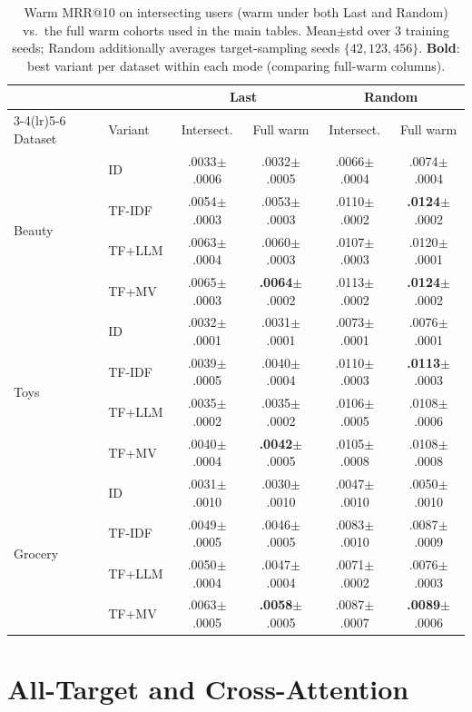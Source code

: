 \documentclass[sigconf,natbib=true,anonymous]{acmart}
\newcommand{\tfidf}{\textsc{TF-IDF}\xspace}
\newcommand{\tfllm}{\textsc{TF+LLM}\xspace}
\newcommand{\tfmv}{\textsc{TF+MV}\xspace}
\begin{document}
\begin{table}[h]
\centering
\caption{Warm MRR@10 on intersecting users (warm under both Last and Random) vs.\ the full warm cohorts used in the main tables. Mean$\pm$std over 3 training seeds; Random additionally averages target-sampling seeds $\{42,123,456\}$. \textbf{Bold}: best variant per dataset within each mode (comparing full-warm columns).}
\label{tab:intersection}
\small
\setlength{\tabcolsep}{3pt}
\begin{tabular}{@{}llcccc@{}}
\toprule
& & \multicolumn{2}{c}{Last} & \multicolumn{2}{c}{Random} \\
\cmidrule(lr){3-4}\cmidrule(lr){5-6}
Dataset & Variant & Intersect. & Full warm & Intersect. & Full warm \\
\midrule
\multirow{4}{*}{Beauty}
 & ID     & .0033$\pm$.0006 & .0032$\pm$.0005 & .0066$\pm$.0004 & .0074$\pm$.0004 \\
 & \tfidf & .0054$\pm$.0003 & .0053$\pm$.0003 & .0110$\pm$.0002 & \textbf{.0124}$\pm$.0002 \\
 & \tfllm & .0063$\pm$.0004 & .0060$\pm$.0003 & .0107$\pm$.0003 & .0120$\pm$.0001 \\
 & \tfmv  & .0065$\pm$.0003 & \textbf{.0064}$\pm$.0002 & .0113$\pm$.0002 & \textbf{.0124}$\pm$.0002 \\
\midrule
\multirow{4}{*}{Toys}
 & ID     & .0032$\pm$.0001 & .0031$\pm$.0001 & .0073$\pm$.0001 & .0076$\pm$.0001 \\
 & \tfidf & .0039$\pm$.0005 & .0040$\pm$.0004 & .0110$\pm$.0003 & \textbf{.0113}$\pm$.0003 \\
 & \tfllm & .0035$\pm$.0002 & .0035$\pm$.0002 & .0106$\pm$.0005 & .0108$\pm$.0006 \\
 & \tfmv  & .0040$\pm$.0004 & \textbf{.0042}$\pm$.0005 & .0105$\pm$.0008 & .0108$\pm$.0008 \\
\midrule
\multirow{4}{*}{Grocery}
 & ID     & .0031$\pm$.0010 & .0030$\pm$.0010 & .0047$\pm$.0010 & .0050$\pm$.0010 \\
 & \tfidf & .0049$\pm$.0005 & .0046$\pm$.0005 & .0083$\pm$.0010 & .0087$\pm$.0009 \\
 & \tfllm & .0050$\pm$.0004 & .0047$\pm$.0004 & .0071$\pm$.0002 & .0076$\pm$.0003 \\
 & \tfmv  & .0063$\pm$.0005 & \textbf{.0058}$\pm$.0005 & .0087$\pm$.0007 & \textbf{.0089}$\pm$.0006 \\
\bottomrule
\end{tabular}
\end{table}

\section{All-Target and Cross-Attention}
\label{app:alltarget}
\end{document}
